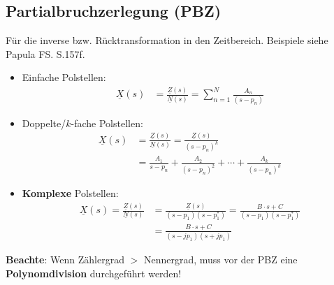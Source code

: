 \subsection{Partialbruchzerlegung (PBZ)}
Für die inverse bzw. Rücktransformation in den Zeitbereich. Beispiele siehe Papula FS. S.157f.
\begin{itemize}[leftmargin=*]
	\item Einfache Polstellen:
		\begin{align*}
		\underline{X}(s) &= \frac{\underline{Z}(s)}{\underline{N}(s)} = \sum_{n=1}^{N} \frac{A_n}{(s - p_n)}
	\end{align*}
	\item Doppelte/$k$-fache Polstellen:
	\begin{align*}
			\underline{X}(s) &= \frac{\underline{Z}(s)}{\underline{N}(s)} = \frac{\underline{Z}(s)}{(s - p_n)^k} \\
			&= \frac{A_1}{s - p_{n}} + \frac{A_2}{(s - p_{n})^2} + \cdots + \frac{A_k}{(s - p_{n})^k}
	\end{align*}
	\item \textbf{Komplexe} Polstellen:
		\begin{align*}
		\underline{X}(s) = \frac{\underline{Z}(s)}{\underline{N}(s)} 
		&= \frac{\underline{Z}(s)}{(s -p_{1})(s - p_{1}^*)}
		= \frac{B \cdot s+C}{(s -p_{1})(s - p_{1}^*)}\\ 
		&= \frac{B \cdot s+C}{(s -jp_{1})(s +jp_{1})}
	\end{align*}
\end{itemize}
\small \textbf{Beachte}: Wenn Zählergrad $>$ Nennergrad, muss vor der PBZ eine \textbf{Polynomdivision} durchgeführt werden!
\normalsize
